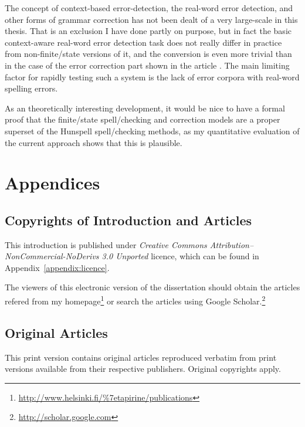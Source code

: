 \documentclass[officiallayout]{unihelcompling}
\newif\ifprintversion
\begin{document}
The concept of context-based error-detection, the real-word error detection,
and other forms of grammar correction has not been dealt of a very large-scale
in this thesis. That is an exclusion I have done partly on purpose, but in fact
the basic context-aware real-word error detection task does not really differ
in practice from non-finite\-/state versions of it, and the conversion is even
more trivial than in the case of the error correction part shown in the article
. The main limiting factor for rapidly testing
such a system is the lack of error corpora with real-word spelling errors.

As an theoretically interesting development, it would be nice to have a formal
proof that the finite\-/state spell\-/checking and correction models are a proper
superset of the Hunspell spell\-/checking methods, as my quantitative
evaluation of the current approach shows that this is plausible.






\appendix
\chapter{Appendices}
\section{Copyrights of Introduction and Articles}
\label{appendix:copyrights}

This introduction is published under \emph{Creative Commons
Attribution–NonCommercial-NoDerivs 3.0 Unported} licence, which can be found in
Appendix~\ref{appendix:licence}. 
\ifprintversion
The articles included
in this print version, reproduced without changes from their originals are
copyrighted property of their respective publishers.
\else
The viewers of this electronic
version of the dissertation should obtain the articles refered from my
homepage\footnote{\url{http://www.helsinki.fi/\%7etapirine/publications}} or
        search the articles using Google
        Scholar.\footnote{\url{http://scholar.google.com}}
\fi

\section{Original Articles}
\label{appendix:articles}

\ifprintversion
This print version contains original articles reproduced verbatim from print
versions available from their respective publishers. Original copyrights apply.
\end{document}
